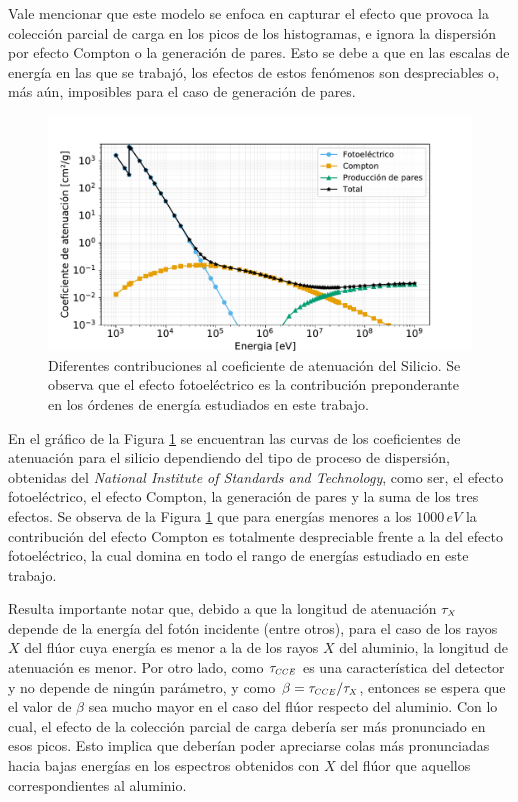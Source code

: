 Vale mencionar que este modelo se enfoca en capturar el efecto que provoca la colección parcial de carga en los picos de los histogramas, e ignora la dispersión por efecto Compton o la generación de pares. Esto se debe a que en las escalas de energía en las que se trabajó, los efectos de estos fenómenos son despreciables o, más aún, imposibles para el caso de generación de pares. 
\begin{figure}[h]
    \centering
        \includegraphics[scale=0.5]{Figs/FotoelectricoComptonPares_enSilicio.pdf}
    \caption{Diferentes contribuciones al coeficiente de atenuación del Silicio. Se observa que el efecto fotoeléctrico es la contribución preponderante en los órdenes de energía estudiados en este trabajo.}
    \label{fig:FotoelectricoComptonPares}
\end{figure}
En el gráfico de la Figura \ref{fig:FotoelectricoComptonPares} se encuentran las curvas de los coeficientes de atenuación para el silicio dependiendo del tipo de proceso de dispersión, obtenidas del \textit{National Institute of Standards and Technology}\cite{FotoComptPar}, como ser, el efecto fotoeléctrico, el efecto Compton, la generación de pares y la suma de los tres efectos. Se observa de la Figura \ref{fig:FotoelectricoComptonPares} que para energías menores a los $1000\,\si{eV}$ la contribución del efecto Compton es totalmente despreciable frente a la del efecto fotoeléctrico, la cual domina en todo el rango de energías estudiado en este trabajo.

Resulta importante notar que, debido a que la longitud de atenuación $\tau_{\scaleto{X}{4pt}}$ depende de la energía del fotón incidente (entre otros), para el caso de los rayos $X$ del flúor cuya energía es menor a la de los rayos $X$ del aluminio, la longitud de atenuación es menor. Por otro lado, como $\tau_{\scaleto{CCE}{4pt}}$ es una característica del detector y no depende de ningún parámetro, y como $\beta = \tau_{\scaleto{CCE}{4pt}}/\tau_{\scaleto{X}{4pt}}$, entonces se espera que el valor de $\beta$ sea mucho mayor en el caso del flúor respecto del aluminio. Con lo cual, el efecto de la colección parcial de carga debería ser más pronunciado en esos picos. Esto implica que deberían poder apreciarse colas más pronunciadas hacia bajas energías en los espectros obtenidos con $X$ del flúor que aquellos correspondientes al aluminio.

